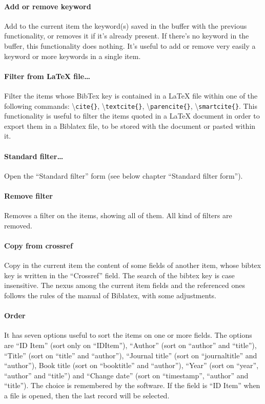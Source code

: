 \documentclass[a4paper,12pt]{report}
\begin{document}
\paragraph{Add or remove keyword} Add to the current item the keyword(s) saved in the buffer with the previous functionality, or removes it if it's already present. If there's no keyword in the buffer, this functionality does nothing. It's useful to add or remove very easily a keyword or more keywords in a single item.

\paragraph{Filter from LaTeX file\dots} Filter the items whose BibTex key is contained in a LaTeX file within one of the following commands: \textbackslash \texttt{cite\{\}}, \textbackslash \texttt{textcite\{\}}, \textbackslash \texttt{parencite\{\}}, \textbackslash \texttt{smartcite\{\}}. This functionality is useful to filter the items quoted in a LaTeX document in order to export them in a Biblatex file, to be stored with the document or pasted within it.

\paragraph{Standard filter\dots } Open the “Standard filter” form (see below chapter “Standard filter form”).

\paragraph{Remove filter} Removes a filter on the items, showing all of them. All kind of filters are removed.

\paragraph{Copy from crossref} Copy in the current item the content of some fields of another item, whose bibtex key is written in the “Crossref” field. The search of the bibtex key is case insensitive. The nexus among the current item fields and the referenced ones follows the rules of the manual of Biblatex, with some adjustments.

\paragraph{Order} It has seven options useful to sort the items on one or more fields. The options are “ID Item” (sort only on “IDItem”), “Author” (sort on “author” and “title”), “Title” (sort on “title” and “author”), “Journal title” (sort on “journaltitle” and “author”), Book title (sort on “booktitle” and “author”), “Year” (sort on “year”, “author” and “title”) and “Change date” (sort on “timestamp”, “author” and “title”). The choice is remembered by the software. If the field is “ID Item” when a file is opened, then the last record will be selected.
\end{document}
